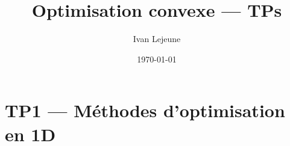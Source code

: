 \documentclass[french,a4paper,10pt]{article}
\title{\color{astral} \sffamily \bfseries Optimisation convexe --- TPs}
\author{Ivan Lejeune}
\date{\today}
\begin{document}
    \maketitle
    \tableofcontents
    
    \newpage
    \section*{TP1 --- Méthodes d'optimisation en 1D}\label{sec:TD1}
    \setcounter{section}{1}
    \setcounter{tdcounter}{0}
    

\end{document}
